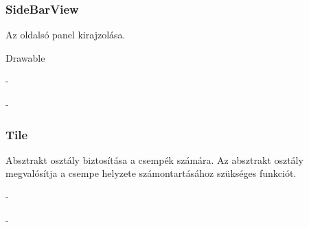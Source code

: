 \subsubsection{SideBarView}
\begin{class-template-responsibility}
    Az oldalsó panel kirajzolása.
\end{class-template-responsibility}
\begin{class-template-interface}
    Drawable
\end{class-template-interface}
\begin{class-template-baseclass}
    -
\end{class-template-baseclass}
\begin{class-template-attribute}
    -
\end{class-template-attribute}
\begin{class-template-method}
\end{class-template-method}

\subsubsection{Tile}
\begin{class-template-responsibility}
    Absztrakt osztály biztosítása a csempék számára. Az absztrakt osztály megvalósítja a csempe helyzete számontartásához szükséges funkciót.
\end{class-template-responsibility}
\begin{class-template-interface}
    -
\end{class-template-interface}
\begin{class-template-baseclass}
    -
\end{class-template-baseclass}
\begin{class-template-attribute}
\end{class-template-attribute}
\begin{class-template-method}
\end{class-template-method}

